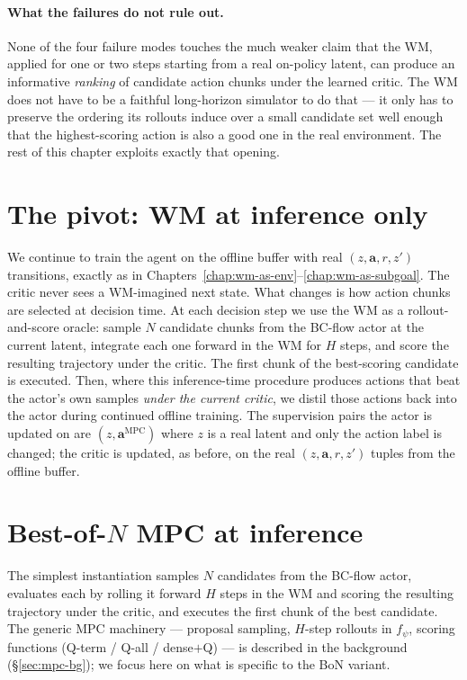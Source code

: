 \paragraph{What the failures do not rule out.}
None of the four failure modes touches the much weaker claim that the
WM, applied for one or two steps starting from a real on-policy latent,
can produce an informative \emph{ranking} of candidate action chunks
under the learned critic. The WM does not have to be a faithful
long-horizon simulator to do that --- it only has to preserve the
ordering its rollouts induce over a small candidate set well enough
that the highest-scoring action is also a good one in the real
environment. The rest of this chapter exploits exactly that opening.

\section{The pivot: WM at inference only}
\label{sec:owm-pivot}

We continue to train the agent on the offline buffer with real
$(z, \mathbf{a}, r, z')$ transitions, exactly as in
Chapters~\ref{chap:wm-as-env}--\ref{chap:wm-as-subgoal}. The critic
never sees a WM-imagined next state. What changes is how action chunks
are selected at decision time. At each decision step we use the WM as
a rollout-and-score oracle: sample $N$ candidate chunks from the
BC-flow actor at the current latent, integrate each one forward in the
WM for $H$ steps, and score the resulting trajectory under the critic.
The first chunk of the best-scoring candidate is executed. Then, where
this inference-time procedure produces actions that beat the actor's
own samples \emph{under the current critic}, we distil those actions
back into the actor during continued offline training. The supervision
pairs the actor is updated on are $(z, \mathbf{a}^{\text{MPC}})$ where
$z$ is a real latent and only the action label is changed; the critic
is updated, as before, on the real $(z, \mathbf{a}, r, z')$ tuples
from the offline buffer.

\section{Best-of-$N$ MPC at inference}
\label{sec:mpc-bon}

The simplest instantiation samples $N$ candidates from the BC-flow
actor, evaluates each by rolling it forward $H$ steps in the WM and
scoring the resulting trajectory under the critic, and executes the
first chunk of the best candidate. The generic MPC machinery ---
proposal sampling, $H$-step rollouts in $f_\psi$, scoring functions
(Q-term / Q-all / dense$+$Q) --- is described in the background
(\S\ref{sec:mpc-bg}); we focus here on what is specific to the BoN
variant.

